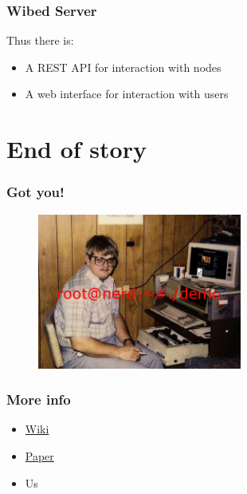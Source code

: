 \documentclass[usepdftitle=false,13pt]{beamer}
\begin{document}
\begin{frame}\frametitle{Wibed Server}

	Thus there is:
	\begin{itemize}
		\item A REST API for interaction with nodes
		\item A web interface for interaction with users
	\end{itemize}

\end{frame}

\section{End of story}

\begin{frame}\frametitle{Got you!}

	\begin{figure}[h!]
	\begin{center}
	\includegraphics[width=0.6\textwidth]{pic/nerd}
	\label{fig:sdn}
	\end{center}
	\end{figure}

\end{frame}

\begin{frame}\frametitle{More info}

	\begin{itemize}
		\item {\color{blue} \href{http://wiki.confine-project.eu/wibed:start}{Wiki}}
		\item {\color{blue} \href{http://wiki.confine-project.eu/_media/wibed:wibed-7pages.pdf}{Paper}}
		\item Us 
	\end{itemize}

\end{frame}
\end{document}
